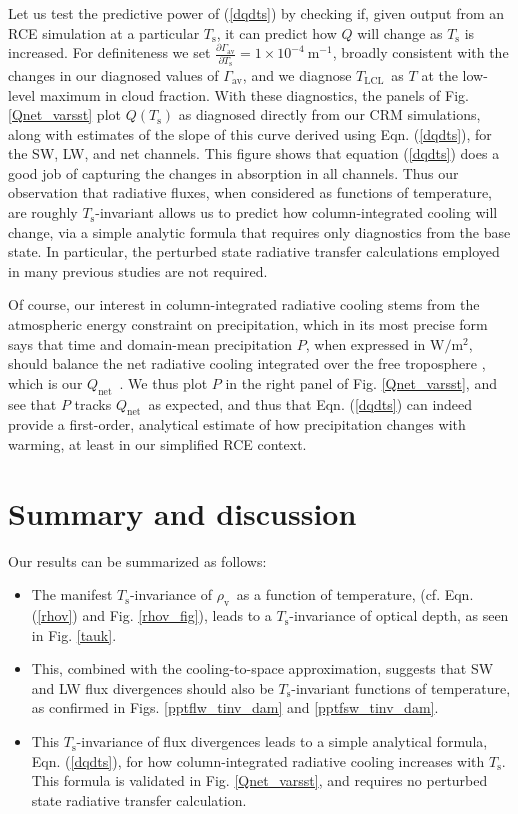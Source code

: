 \documentclass[10pt]{article}
\newcommand{\eqnref}[1]{(\ref{#1})}
\newcommand{\inverse}{^{-1}}
\newcommand{\partialderf}[2]{\ensuremath{\frac{\partial #1}{\partial #2}}}
\newcommand{\Qnet}{\ensuremath{Q_\mathrm{net}}}
\newcommand{\rhov}{\ensuremath{\rho_\mathrm{v}}}
\newcommand{\Ts}{\ensuremath{T_\mathrm{s}}}
\newcommand{\Tlcl}{\ensuremath{T_\mathrm{LCL}}}
\newcommand{\gammaav}{\ensuremath{\Gamma_\mathrm{av}}}
\begin{document}
Let us test the predictive power of \eqnref{dqdts} by checking if, given output from an RCE simulation at a particular \Ts, it can predict how $Q$ will change as $\Ts$ is increased. For definiteness we set $\partialderf{\gammaav}{\Ts}= 1\times 10^{-4} \ \mathrm{m\inverse}$, broadly consistent with the changes in our diagnosed values of \gammaav, and we  diagnose \Tlcl\ as $T$ at the low-level maximum in cloud fraction. With these diagnostics, the panels of Fig. \ref{Qnet_varsst} plot $Q(\Ts)$ as diagnosed directly from our CRM simulations, along with estimates of the slope of this curve derived using  Eqn. \eqnref{dqdts}, for the SW, LW, and net  channels. This figure shows that equation \eqnref{dqdts} does a good job of capturing the changes in  absorption in all channels. Thus our observation that radiative fluxes, when considered as functions of temperature, are roughly \Ts-invariant allows us to  predict how column-integrated cooling will change, via a simple analytic formula that requires only diagnostics from the base state. In particular, the perturbed state radiative transfer calculations employed in many previous studies \citep[e.g.][]{pendergrass2014,ogorman2012, held2006} are not required. 

Of course,  our interest in column-integrated radiative cooling stems from the atmospheric energy constraint on precipitation, which in its most precise form says that time and domain-mean precipitation $P$, when expressed in $\mathrm{W/m^2}$, should balance the net radiative cooling integrated over the free troposphere \citep{ogorman2012}, which is our \Qnet\ . We thus plot $P$ in the right panel of Fig. \ref{Qnet_varsst}, and see that $P$ tracks \Qnet\ as expected, and thus that Eqn. \eqnref{dqdts} can indeed provide a first-order, analytical estimate of how precipitation changes with warming, at least in our simplified RCE context.



\section{Summary and discussion}
Our results can be summarized as follows:
\begin{itemize}
	\item The manifest \Ts-invariance of \rhov\ as a function of temperature, (cf. Eqn. \eqnref{rhov} and Fig. \ref{rhov_fig}), leads to a \Ts-invariance of optical depth, as seen in Fig. \ref{tauk}.
	\item This, combined with the cooling-to-space approximation, suggests that SW and LW flux divergences should also be \Ts-invariant functions of temperature, as confirmed in Figs. \ref{pptflw_tinv_dam} and \ref{pptfsw_tinv_dam}.
	\item This \Ts-invariance of flux divergences leads to a simple analytical formula, Eqn. \eqnref{dqdts}, for how column-integrated radiative cooling increases with \Ts. This formula is validated in Fig. \ref{Qnet_varsst},  and requires no perturbed state radiative transfer calculation.
	\end{itemize}
\end{document}
